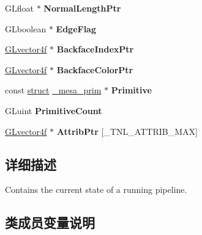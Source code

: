 \begin{DoxyCompactItemize}
\item 
\mbox{\label{structvertex__buffer_a4394eb3c9e62cf19d885b9848049ce51}} 
G\+Lfloat $\ast$ {\bfseries Normal\+Length\+Ptr}
\item 
\mbox{\label{structvertex__buffer_aff1d89c09878b87821434a22c428102f}} 
G\+Lboolean $\ast$ {\bfseries Edge\+Flag}
\item 
\mbox{\label{structvertex__buffer_ae5d4a0824be4adc37000aeb6fecea4f3}} 
\hyperlink{struct_g_lvector4f}{G\+Lvector4f} $\ast$ {\bfseries Backface\+Index\+Ptr}
\item 
\mbox{\label{structvertex__buffer_ad1fd4d09cf1fabaeaf4a9bdc485cd31e}} 
\hyperlink{struct_g_lvector4f}{G\+Lvector4f} $\ast$ {\bfseries Backface\+Color\+Ptr}
\item 
\mbox{\label{structvertex__buffer_a1887b0b51a5239e83980d382e83a98a3}} 
const \hyperlink{interfacestruct}{struct} \hyperlink{struct__mesa__prim}{\+\_\+mesa\+\_\+prim} $\ast$ {\bfseries Primitive}
\item 
\mbox{\label{structvertex__buffer_ad2b157a8b87de213690a9faef5daf379}} 
G\+Luint {\bfseries Primitive\+Count}
\item 
\mbox{\label{structvertex__buffer_adeab5892e64a92e4b38ad84f07bd6922}} 
\hyperlink{struct_g_lvector4f}{G\+Lvector4f} $\ast$ {\bfseries Attrib\+Ptr} \mbox{[}\+\_\+\+T\+N\+L\+\_\+\+A\+T\+T\+R\+I\+B\+\_\+\+M\+AX\mbox{]}
\end{DoxyCompactItemize}


\subsection{详细描述}
Contains the current state of a running pipeline. 

\subsection{类成员变量说明}
\mbox{\label{structvertex__buffer_a57863134e7679f774853f5226e2489ae}} 
